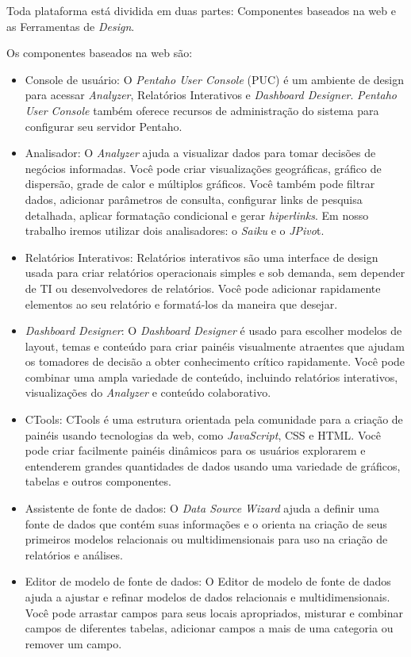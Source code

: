 Toda plataforma est\'{a} dividida em duas partes: Componentes baseados na web e as Ferramentas de \textit{Design}.

Os componentes baseados na web s\~{a}o:

\begin{itemize}
    \item Console de usu\'{a}rio: O \textit{Pentaho User Console} (PUC) \'{e} um ambiente de design para acessar \textit{Analyzer}, Relat\'orios Interativos e \textit{Dashboard Designer}. \textit{Pentaho User Console} tamb\'{e}m oferece recursos de administra\c{c}\~{a}o do sistema para configurar seu servidor Pentaho.
    \item Analisador: O \textit{Analyzer} ajuda a visualizar dados para tomar decis\~{o}es de neg\'ocios informadas. Você pode criar visualiza\c{c}\~{o}es geogr\'{a}ficas, gr\'{a}fico de dispers\~{a}o, grade de calor e múltiplos gr\'{a}ficos. Você tamb\'{e}m pode filtrar dados, adicionar par\^{a}metros de consulta, configurar links de pesquisa detalhada, aplicar formata\c{c}\~{a}o condicional e gerar \textit{hiperlinks}. Em nosso trabalho iremos utilizar dois analisadores: o \textit{Saiku} e o \textit{JPivo}t.
    \item Relat\'orios Interativos: Relat\'orios interativos s\~{a}o uma interface de design usada para criar relat\'orios operacionais simples e sob demanda, sem depender de TI ou desenvolvedores de relat\'orios. Você pode adicionar rapidamente elementos ao seu relat\'orio e format\'{a}-los da maneira que desejar.
    \item \textit{Dashboard Designer}: O \textit{Dashboard Designer} \'{e} usado para escolher modelos de layout, temas e conteúdo para criar pain\'{e}is visualmente atraentes que ajudam os tomadores de decis\~{a}o a obter conhecimento cr\'{i}tico rapidamente. Você pode combinar uma ampla variedade de conteúdo, incluindo relat\'orios interativos, visualiza\c{c}\~{o}es do \textit{Analyzer} e conteúdo colaborativo.
    \item CTools: CTools \'{e} uma estrutura orientada pela comunidade para a cria\c{c}\~{a}o de pain\'{e}is usando tecnologias da web, como \textit{JavaScript}, CSS e HTML. Você pode criar facilmente pain\'{e}is din\^{a}micos para os usu\'{a}rios explorarem e entenderem grandes quantidades de dados usando uma variedade de gr\'{a}ficos, tabelas e outros componentes.
    \item Assistente de fonte de dados: O \textit{Data Source Wizard} ajuda a definir uma fonte de dados que cont\'{e}m suas informa\c{c}\~{o}es e o orienta na cria\c{c}\~{a}o de seus primeiros modelos relacionais ou multidimensionais para uso na cria\c{c}\~{a}o de relat\'orios e an\'{a}lises.
    \item Editor de modelo de fonte de dados: O Editor de modelo de fonte de dados ajuda a ajustar e refinar modelos de dados relacionais e multidimensionais. Você pode arrastar campos para seus locais apropriados, misturar e combinar campos de diferentes tabelas, adicionar campos a mais de uma categoria ou remover um campo.
\end{itemize}

